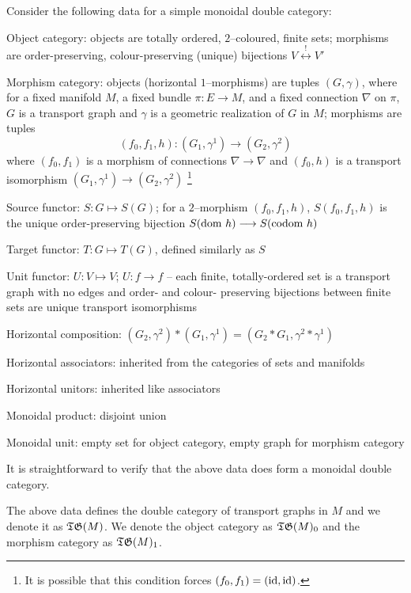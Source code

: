 \documentclass[./Thick_TQFTs_and_Quantum_Information.tex]{subfiles}
\begin{document}
Consider the following data for a simple monoidal double category:
\begin{enmrt}
\li Object category: objects are totally ordered, $2$--coloured, finite sets;
morphisms are order-preserving, colour-preserving (unique) bijections
$V \stackrel{!}{\longleftrightarrow} V'$

\li Morphism category: objects (horizontal $1$--morphisms) are tuples
$(G, \gamma)$, where for a fixed manifold $M$, a fixed bundle $\pi : E \to M$,
and a fixed connection $\nabla$ on $\pi$, $G$ is a transport graph and $\gamma$
is a geometric realization of $G$ in $M$; morphisms are tuples
\[
  (f_0, f_1, h) : (G_1, \gamma^1) \to (G_2, \gamma^2)
\]
where $(f_0, f_1)$ is a morphism of connections $\nabla \to \nabla$ and
$(f_0, h)$ is a transport isomorphism $(G_1, \gamma^1) \to (G_2, \gamma^2)$
\footnote{It is possible that this condition forces $(f_0, f_1) = (\text{id}, \text{id})$.}

\li Source functor: $S : G \mapsto S(G)$; for a $2$--morphism $(f_0, f_1, h)$,
$S(f_0, f_1, h)$ is the unique order-preserving bijection
$S(\text{dom } h) \stackrel{}{\longrightarrow} S(\text{codom } h)$

\li Target functor: $T : G \mapsto T(G)$, defined similarly as $S$

\li Unit functor: $U : V \mapsto V$; $U : f \to f$ -- each finite,
totally-ordered set is a transport graph with no edges and order- and colour-
preserving bijections between finite sets are unique transport isomorphisms

\li Horizontal composition:
$(G_2, \gamma^2) * (G_1, \gamma^1) = (G_2 * G_1, \gamma^2 * \gamma^1)$

\li Horizontal associators: inherited from the categories of sets and manifolds

\li Horizontal unitors: inherited like associators

\li Monoidal product: disjoint union

\li Monoidal unit: empty set for object category, empty graph for morphism
category
\end{enmrt}

It is straightforward to verify that the above data does form a monoidal double
category.

\begin{defn}
The above data defines the double category of transport graphs in $M$ and we
denote it as $\mathfrak{TG}(M)$. We denote the object category as $\mathfrak{TG}(M)_0$ and the
morphism category as $\mathfrak{TG}(M)_1$.
\end{defn}
\end{document}
